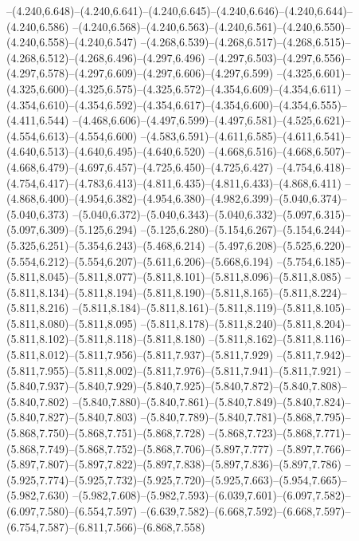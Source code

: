   --(4.240,6.648)--(4.240,6.641)--(4.240,6.645)--(4.240,6.646)--(4.240,6.644)--(4.240,6.586)%
  --(4.240,6.568)--(4.240,6.563)--(4.240,6.561)--(4.240,6.550)--(4.240,6.558)--(4.240,6.547)%
  --(4.268,6.539)--(4.268,6.517)--(4.268,6.515)--(4.268,6.512)--(4.268,6.496)--(4.297,6.496)%
  --(4.297,6.503)--(4.297,6.556)--(4.297,6.578)--(4.297,6.609)--(4.297,6.606)--(4.297,6.599)%
  --(4.325,6.601)--(4.325,6.600)--(4.325,6.575)--(4.325,6.572)--(4.354,6.609)--(4.354,6.611)%
  --(4.354,6.610)--(4.354,6.592)--(4.354,6.617)--(4.354,6.600)--(4.354,6.555)--(4.411,6.544)%
  --(4.468,6.606)--(4.497,6.599)--(4.497,6.581)--(4.525,6.621)--(4.554,6.613)--(4.554,6.600)%
  --(4.583,6.591)--(4.611,6.585)--(4.611,6.541)--(4.640,6.513)--(4.640,6.495)--(4.640,6.520)%
  --(4.668,6.516)--(4.668,6.507)--(4.668,6.479)--(4.697,6.457)--(4.725,6.450)--(4.725,6.427)%
  --(4.754,6.418)--(4.754,6.417)--(4.783,6.413)--(4.811,6.435)--(4.811,6.433)--(4.868,6.411)%
  --(4.868,6.400)--(4.954,6.382)--(4.954,6.380)--(4.982,6.399)--(5.040,6.374)--(5.040,6.373)%
  --(5.040,6.372)--(5.040,6.343)--(5.040,6.332)--(5.097,6.315)--(5.097,6.309)--(5.125,6.294)%
  --(5.125,6.280)--(5.154,6.267)--(5.154,6.244)--(5.325,6.251)--(5.354,6.243)--(5.468,6.214)%
  --(5.497,6.208)--(5.525,6.220)--(5.554,6.212)--(5.554,6.207)--(5.611,6.206)--(5.668,6.194)%
  --(5.754,6.185)--(5.811,8.045)--(5.811,8.077)--(5.811,8.101)--(5.811,8.096)--(5.811,8.085)%
  --(5.811,8.134)--(5.811,8.194)--(5.811,8.190)--(5.811,8.165)--(5.811,8.224)--(5.811,8.216)%
  --(5.811,8.184)--(5.811,8.161)--(5.811,8.119)--(5.811,8.105)--(5.811,8.080)--(5.811,8.095)%
  --(5.811,8.178)--(5.811,8.240)--(5.811,8.204)--(5.811,8.102)--(5.811,8.118)--(5.811,8.180)%
  --(5.811,8.162)--(5.811,8.116)--(5.811,8.012)--(5.811,7.956)--(5.811,7.937)--(5.811,7.929)%
  --(5.811,7.942)--(5.811,7.955)--(5.811,8.002)--(5.811,7.976)--(5.811,7.941)--(5.811,7.921)%
  --(5.840,7.937)--(5.840,7.929)--(5.840,7.925)--(5.840,7.872)--(5.840,7.808)--(5.840,7.802)%
  --(5.840,7.880)--(5.840,7.861)--(5.840,7.849)--(5.840,7.824)--(5.840,7.827)--(5.840,7.803)%
  --(5.840,7.789)--(5.840,7.781)--(5.868,7.795)--(5.868,7.750)--(5.868,7.751)--(5.868,7.728)%
  --(5.868,7.723)--(5.868,7.771)--(5.868,7.749)--(5.868,7.752)--(5.868,7.706)--(5.897,7.777)%
  --(5.897,7.766)--(5.897,7.807)--(5.897,7.822)--(5.897,7.838)--(5.897,7.836)--(5.897,7.786)%
  --(5.925,7.774)--(5.925,7.732)--(5.925,7.720)--(5.925,7.663)--(5.954,7.665)--(5.982,7.630)%
  --(5.982,7.608)--(5.982,7.593)--(6.039,7.601)--(6.097,7.582)--(6.097,7.580)--(6.554,7.597)%
  --(6.639,7.582)--(6.668,7.592)--(6.668,7.597)--(6.754,7.587)--(6.811,7.566)--(6.868,7.558)%
